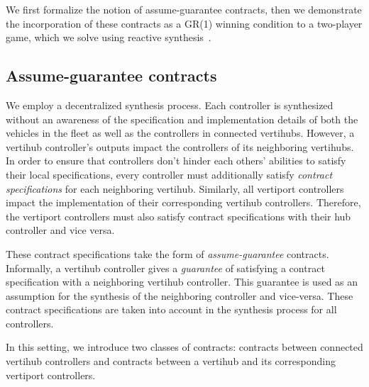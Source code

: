 We first formalize the notion of assume-guarantee contracts, then we demonstrate the incorporation of these contracts as a GR(1) winning condition to a two-player game, which we solve using reactive synthesis~\cite{Piterman06,bloem2012}. 

\subsection{Assume-guarantee contracts}

We employ a decentralized synthesis process. Each controller is synthesized without an awareness of the specification and implementation details of both the vehicles in the fleet as well as the controllers in connected vertihubs.
However, a vertihub controller's outputs impact the controllers of its neighboring vertihubs. 
In order to ensure that controllers don't hinder each others' abilities to satisfy their local specifications, every controller must additionally satisfy \emph{contract specifications} for each neighboring vertihub.
Similarly, all vertiport controllers impact the implementation of their corresponding vertihub controllers. Therefore, the vertiport controllers must also satisfy contract specifications with their hub controller and vice versa. 

 These contract specifications take the form of \emph{assume-guarantee} contracts. 
 Informally, a vertihub controller gives a \emph{guarantee} of satisfying a contract specification with a neighboring vertihub controller.
 This guarantee is used as an assumption for the synthesis of the neighboring controller and vice-versa.
 These contract specifications are taken into account in the synthesis process for all controllers. 


 
 In this setting, we introduce two classes of contracts: contracts between connected vertihub controllers and contracts between a vertihub and its corresponding vertiport controllers. 
 
